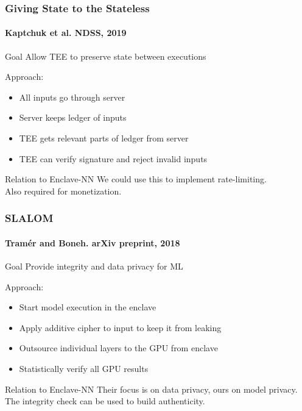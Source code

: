 \documentclass[aspectratio=169,nototalframenumber]{beamer}
\begin{document}

\begin{frame}
  \frametitle{Giving State to the Stateless}
  \framesubtitle{\small Kaptchuk et al. NDSS, 2019}
  \begin{block}{Goal}
    Allow TEE to preserve state between executions
  \end{block}
  \pause
  Approach:
  \begin{itemize}
  \item All inputs go through server
  \item Server keeps ledger of inputs
  \item TEE gets relevant parts of ledger from server
  \item TEE can verify signature and reject invalid inputs
  \end{itemize}
  \pause
  \begin{alertblock}{Relation to Enclave-NN}
    We could use this to implement rate-limiting.\\
    Also required for monetization.
  \end{alertblock}
\end{frame}

\begin{frame}
  \frametitle{SLALOM}
  \framesubtitle{\small Tram\'er and Boneh. arXiv preprint, 2018}
  \begin{block}{Goal}
    Provide integrity and data privacy for ML
  \end{block}
  \pause
  Approach:
  \begin{itemize}
  \item Start model execution in the enclave
  \item Apply additive cipher to input to keep it from leaking
  \item Outsource individual layers to the GPU from enclave
  \item Statistically verify all GPU results
  \end{itemize}
  \pause
  \begin{alertblock}{Relation to Enclave-NN}
    Their focus is on data privacy, ours on model privacy.\\
    The integrity check can be used to build authenticity.
  \end{alertblock}
\end{frame}
\end{document}

